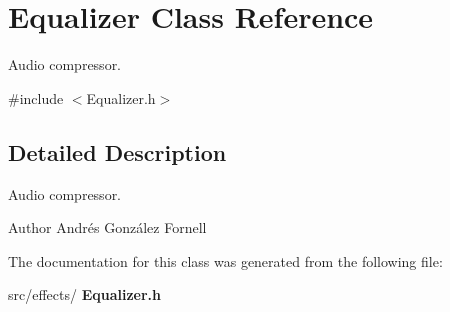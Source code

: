 \section{Equalizer Class Reference}
\label{class_equalizer}


Audio compressor.  




{\ttfamily \#include $<$Equalizer.\+h$>$}



\subsection{Detailed Description}
Audio compressor. 

\begin{DoxyAuthor}{Author}
Andrés González Fornell 
\end{DoxyAuthor}


The documentation for this class was generated from the following file\+:\begin{DoxyCompactItemize}
\item 
src/effects/\textbf{ Equalizer.\+h}\end{DoxyCompactItemize}
